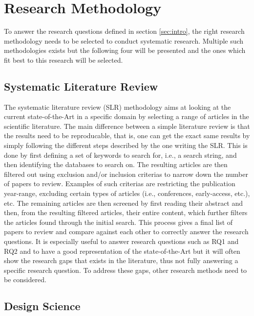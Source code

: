 
\section{Research Methodology}
\label{sec:methodology}

To answer the research questions defined in section \ref{sec:intro},
the right research methodology needs to be selected to conduct 
systematic research.
Multiple such methodologies exists but the following four will be presented
and the ones which fit best to this research will be selected.

\subsection{Systematic Literature Review}

The systematic literature review (SLR) methodology aims at
looking at the current state-of-the-Art in a specific domain by selecting a range 
of articles in the scientific literature\cite{KITCHENHAM2009SLR}.
The main difference between a simple literature review is that the results need to be reproducable,
that is, one can get the exact same results by simply following the different steps described by the one writing the SLR.
This is done by first defining a set of keywords to search for, i.e., a search string, 
and then identifying the databases to search on.
The resulting articles are then filtered out using exclusion and/or inclusion criterias
to narrow down the number of papers to review.
Examples of such criterias are restricting the publication year-range,
excluding certain types of articles (i.e., conferences, early-access, etc.), etc.
The remaining articles are then screened by first reading 
their abstract and then, from the resulting filtered articles, their entire content,
which further filters the articles found through the initial search.
This process gives a final list of papers to review and compare against each other 
to correctly answer the research questions. 
It is especially useful to answer research questions such as RQ1 and RQ2
and to have a good representation of the state-of-the-Art
but it will often show the research gaps that exists in the literature,
thus not fully answering a specific research question.
To address these gaps, other research methods need to be considered.

\subsection{Design Science}

